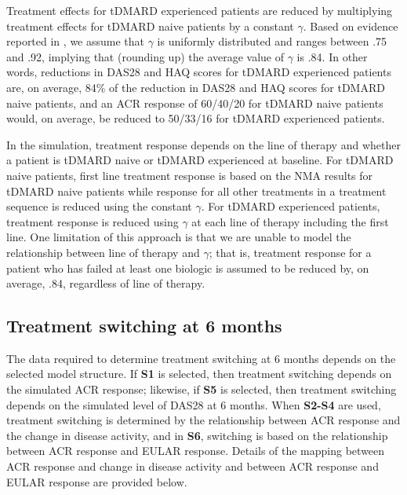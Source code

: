 \documentclass[11pt,final,fleqn]{article}\usepackage[]{graphicx}\usepackage[]{color}
\theoremstyle{plain}
\begin{document}
Treatment effects for tDMARD experienced patients are reduced by multiplying treatment effects for tDMARD naive patients by a constant $\gamma$. Based on evidence reported in \citet{carlson2015economic}, we assume that $\gamma$ is uniformly distributed and ranges between .75 and .92, implying that (rounding up) the average value of $\gamma$ is .84. In other words, reductions in DAS28 and HAQ scores for tDMARD experienced patients are, on average, 84\% of the reduction in DAS28 and HAQ scores for tDMARD naive patients, and an ACR response of 60/40/20 for tDMARD naive patients would, on average, be reduced to 50/33/16 for tDMARD experienced patients. 

In the simulation, treatment response depends on the line of therapy and whether a patient is tDMARD naive or tDMARD experienced at baseline. For tDMARD naive patients, first line treatment response is based on the NMA results for tDMARD naive patients while response for all other treatments in a treatment sequence is reduced using the constant $\gamma$. For tDMARD experienced patients, treatment response is reduced using $\gamma$ at each line of therapy including the first line. One limitation of this approach is that we are unable to model the relationship between line of therapy and $\gamma$; that is, treatment response for a patient who has failed at least one biologic is assumed to be reduced by, on average, .84, regardless of line of therapy. 

\subsection{Treatment switching at 6 months}
The data required to determine treatment switching at 6 months depends on the selected model structure. If \textbf{S1} is selected, then treatment switching depends on the simulated ACR response; likewise, if \textbf{S5} is selected, then treatment switching depends on the simulated level of DAS28 at 6 months. When \textbf{S2-S4} are used, treatment switching is determined by the relationship between ACR response and the change in disease activity, and in \textbf{S6}, switching is based on the relationship between ACR response and EULAR response. Details of the mapping between ACR response and change in disease activity and between ACR response and EULAR response are provided below.  
\end{document}
